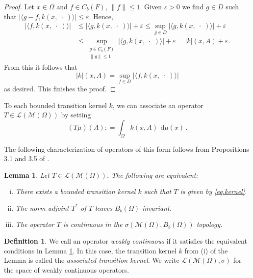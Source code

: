 \documentclass{amsart}
\numberwithin{equation}{section}
\newtheorem{lem}[thm]{Lemma}
\theoremstyle{remark}
\theoremstyle{definition}
\newtheorem{defn}[thm]{Definition}
\begin{document}
\begin{proof}
	Let $x\in \Omega$ and $f\in C_b(F)$, $\lVert f\rVert \leq 1$. Given ${\varepsilon}>0$ we find $g\in D$ such that 
	$\lvert {\langle {g-f},{k(x,\;\cdot\;)}\rangle} \rvert \leq {\varepsilon}$. Hence,
	\begin{align*}
	\lvert {\langle {f},{k(x,\;\cdot\;)}\rangle}\rvert &\leq \lvert {\langle {g},{k(x,\;\cdot\;)}\rangle}\rvert +{\varepsilon} 
	\leq \sup_{g\in D} \lvert {\langle {g},{k(x,\;\cdot\;)}\rangle}\rvert + {\varepsilon}\\
	&\leq \sup_{\substack{g\in C_b(F)\\\lVert g\rVert\leq 1}} \lvert {\langle {g},{k(x,\;\cdot\;)}\rangle}\rvert + {\varepsilon} = \lvert k\rvert (x,A)+
	    {\varepsilon}.
	\end{align*}
	From this it follows that
	\[ \lvert k\rvert(x,A) = \sup_{f\in D} \lvert {\langle {f},{k(x,\;\cdot\;)}\rangle}\rvert\]
	as desired. This finishes the proof.
\end{proof}

To each bounded transition kernel $k$, we can associate an operator $T \in \mathscr{L}(\mathscr{M}(\Omega))$ by setting
\begin{equation}\label{eq.kernel}
(T\mu)(A)  {\mathrel{\mathop:}=} \int_\Omega k(x,A)\, {\:\mathrm{d}}\mu (x)\, .
\end{equation}

The following characterization of operators of this form follows from Propositions 3.1 and 3.5 of \cite{kunze2011}.

\begin{lem}\label{l.weakcont}
Let $T \in \mathscr{L}(\mathscr{M}(\Omega))$. The following are equivalent:
\begin{enumerate}[(i)]
\item There exists a bounded transition kernel $k$ such that $T$ is given by \eqref{eq.kernel}.
\item The norm adjoint $T^*$ of $T$ leaves $B_b(\Omega)$ invariant.
\item The operator $T$ is continuous in the $\sigma(\mathscr{M}(\Omega), B_b(\Omega))$ topology.
\end{enumerate}
\end{lem}

\begin{defn}
We call an operator \emph{weakly continuous} if it satisfies the equivalent conditions in Lemma \ref{l.weakcont}.
In this case, the transition kernel $k$ from (i) of the Lemma is called the \emph{associated transition kernel}.
We write $\mathscr{L}(\mathscr{M}(\Omega), \sigma)$ for the space of weakly continuous operators.
\end{defn}
\end{document}
